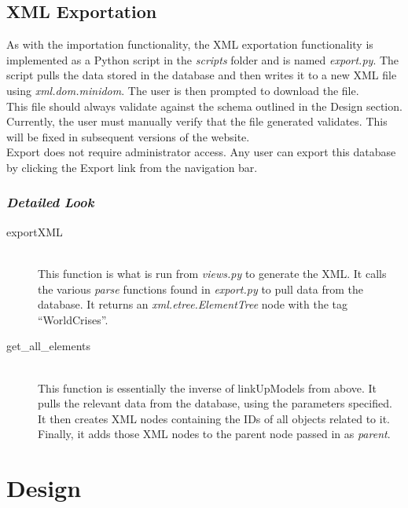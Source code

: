 \documentclass[12pt]{report}
\begin{document}
\subsection*{XML Exportation}
\hfill


As with the importation functionality, the XML exportation functionality is implemented as a Python script in the \emph{scripts} folder and is named \emph{export.py}.
The script pulls the data stored in the database and then writes it to a new XML file using \emph{xml.dom.minidom}.
The user is then prompted to download the file.\\

This file should always validate against the schema outlined in the Design section.
Currently, the user must manually verify that the file generated validates.
This will be fixed in subsequent versions of the website.\\

Export does not require administrator access.
Any user can export this database by clicking the Export link from the navigation bar.\\

\subsubsection*{\emph{Detailed Look}}
\begin{description}
    \item[exportXML] \hfill \\
        This function is what is run from \emph{views.py} to generate the XML.
        It calls the various \emph{parse} functions found in \emph{export.py} to pull data from the database.
        It returns an \emph{xml.etree.ElementTree} node with the tag ``WorldCrises''.\\

    \item[get\_all\_elements] \hfill \\
        This function is essentially the inverse of linkUpModels from above.
        It pulls the relevant data from the database, using the parameters specified.
        It then creates XML nodes containing the IDs of all objects related to it.
        Finally, it adds those XML nodes to the parent node passed in as \emph{parent}.\\
\end{description}


\newpage
\section*{Design}
\end{document}
